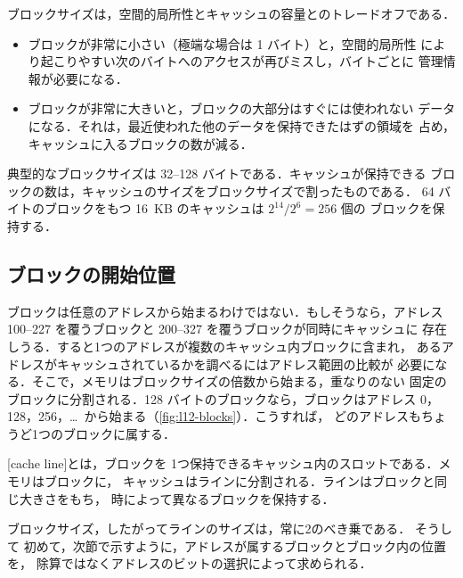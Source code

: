 \documentclass[../main.tex]{subfiles}
\begin{document}
ブロックサイズは，空間的局所性とキャッシュの容量とのトレードオフである．
\begin{itemize}
  \item ブロックが非常に小さい（極端な場合は 1 バイト）と，空間的局所性
    により起こりやすい次のバイトへのアクセスが再びミスし，バイトごとに
    管理情報が必要になる．
  \item ブロックが非常に大きいと，ブロックの大部分はすぐには使われない
    データになる．それは，最近使われた他のデータを保持できたはずの領域を
    占め，キャッシュに入るブロックの数が減る．
\end{itemize}
典型的なブロックサイズは 32--128 バイトである．キャッシュが保持できる
ブロックの数は，キャッシュのサイズをブロックサイズで割ったものである．
64 バイトのブロックをもつ 16~KB のキャッシュは $2^{14}/2^{6} = 256$ 個の
ブロックを保持する．

\subsection{ブロックの開始位置}

ブロックは任意のアドレスから始まるわけではない．もしそうなら，アドレス
100--227 を覆うブロックと 200--327 を覆うブロックが同時にキャッシュに
存在しうる．すると1つのアドレスが複数のキャッシュ内ブロックに含まれ，
あるアドレスがキャッシュされているかを調べるにはアドレス範囲の比較が
必要になる．そこで，メモリはブロックサイズの倍数から始まる，重なりのない
固定のブロックに分割される．128 バイトのブロックなら，ブロックはアドレス
0，128，256，\ldots\ から始まる（\cref{fig:l12-blocks}）．こうすれば，
どのアドレスもちょうど1つのブロックに属する．

\begin{definition}[キャッシュライン]
  [cache line]とは，ブロックを
  1つ保持できるキャッシュ内のスロットである．メモリはブロックに，
  キャッシュはラインに分割される．ラインはブロックと同じ大きさをもち，
  時によって異なるブロックを保持する．
\end{definition}

ブロックサイズ，したがってラインのサイズは，常に2のべき乗である．%
そうして
初めて，次節で示すように，アドレスが属するブロックとブロック内の位置を，
除算ではなくアドレスのビットの選択によって求められる．
\end{document}
